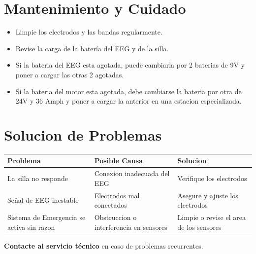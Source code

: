 \documentclass{article}
\begin{document}
\section{Mantenimiento y Cuidado}
\begin{itemize}
    \item Limpie los electrodos y las bandas regularmente.
    \item Revise la carga de la batería del EEG y de la silla.
    \item Si la bateria del EEG esta agotada, puede cambiarla por 2 baterias de 9V y poner a cargar las otras 2 agotadas.
    \item Si la bateria del motor esta agotada, debe cambiarse la bateria por otra de 24V y 36 Amph y poner a cargar la anterior en una estacion especializada.
\end{itemize}

\section{Solucion de Problemas}

\begin{table}[H]
    \renewcommand{\arraystretch}{1.5}
    \centering
    \begin{tabular}{|p{4cm}|p{4cm}|p{4cm}|}
        \hline
        Problema & Posible Causa & Solucion \\
        \hline
        La silla no responde & Conexion inadecuada del EEG & Verifique los electrodos \\
        \hline
        Señal de EEG inestable & Electrodos mal conectados & Asegure y ajuste los electrodos \\
        \hline
        Sistema de Emergencia se activa sin razon & Obstruccion o interferencia en sensores & Limpie o revise el area de los sensores \\
        \hline
    \end{tabular}
\end{table}
\textbf{Contacte al servicio técnico} en caso de problemas recurrentes.
\end{document}

